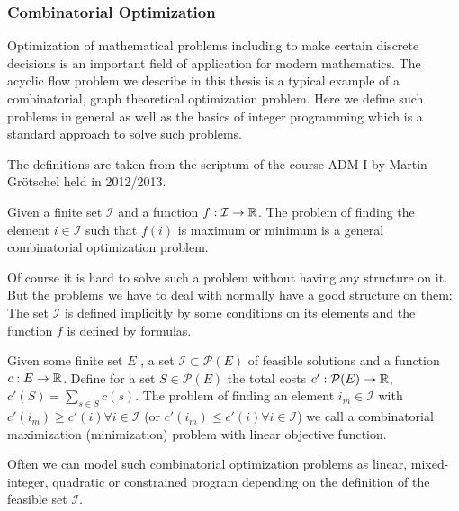 
\subsubsection{Combinatorial Optimization}
Optimization of mathematical problems including to make certain discrete decisions is an important field of application 
for modern mathematics. The acyclic flow problem we describe in this thesis is a typical example of a combinatorial, 
graph theoretical optimization problem. Here we define such problems in general as well as the basics of integer 
programming which is a standard approach to solve such problems. 

The definitions are taken from the scriptum of the course ADM I by Martin Gr\"otschel held in 2012/2013. %

\begin{definition}
 Given a finite set $\mathcal{I}$ and a function $f:\mathcal{I}\to\mathbb{R}$. The problem of finding the element 
$i\in\mathcal{I}$ such that $f(i)$ is maximum or minimum is a general combinatorial optimization problem.
\end{definition}
Of course it is hard to solve such a problem without having any structure on it. But the problems we have to deal with 
normally have  a good structure on them: The set $\mathcal{I}$ is defined implicitly by some conditions on its elements 
and the function $f$ is defined by formulas.

\begin{definition}
 Given some finite set $E$ , a set $\mathcal{I}\subset \mathcal{P}(E)$ of feasible solutions and a function 
 $c:E\to \mathbb{R}$. Define for a set $S \in \mathcal{P}(E)$ the total costs $c':\mathcal{P}(E)\to \mathbb{R}$, 
 $c'(S)=\sum_{s\in S}c(s)$. The problem of finding an element $i_m\in\mathcal{I}$ with $c'(i_m)\ge c'(i)\forall 
i\in\mathcal{I} $ (or $c'(i_m)\le c'(i)\forall i\in\mathcal{I} $) we call a combinatorial maximization (minimization) 
problem with linear objective function.
\end{definition}

Often we can model such combinatorial optimization problems as linear, mixed-integer, quadratic or constrained program 
depending on the definition of the feasible set $\mathcal{I}$. 

